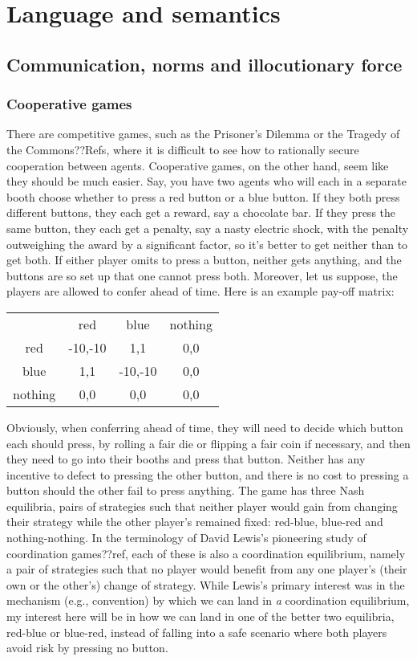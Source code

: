 \def\mychapter{VII}

\chapter{Language and semantics}\label{ch:semantics}
\section{Communication, norms and illocutionary force}
\subsection{Cooperative games}
There are competitive games, such as the Prisoner's Dilemma or the Tragedy of the Commons??Refs, where it is difficult 
to see how to rationally secure cooperation between agents. Cooperative games, on the other hand, seem like
they should be much easier. Say, you have
two agents who will each in a separate booth choose whether to press a red button or a blue button. If they both
press different buttons, they each get a reward, say a chocolate bar. If they press the same button, they 
each get a penalty, say a nasty electric shock, with the penalty outweighing the award by a significant factor, so it's better 
to get neither than to get both. If either player omits to press a button, neither gets anything, and the buttons are so 
set up that one cannot press both. Moreover, let us suppose, the players are allowed to confer ahead of time. Here is an
example pay-off matrix:

\begin{center}
\begin{tabular}{ cccc }
\hline
    & red & blue & nothing \\
red & -10,-10 & 1,1  & 0,0 \\
blue & 1,1 & -10,-10 & 0,0 \\
nothing & 0,0 & 0,0 & 0,0 \\
\hline
\end{tabular}
\end{center}

Obviously, when conferring ahead of time, they will need to decide which button each should press, by rolling a fair die or
flipping a fair coin if
necessary, and then they need to go into their booths and press that button. Neither has any incentive to defect
to pressing the other button, and there is no cost to pressing a button should the other fail to press
anything. The game has three Nash equilibria, pairs of strategies such that neither player would gain from
changing their strategy while the other player's remained fixed: red-blue, blue-red and nothing-nothing. In 
the terminology of David Lewis's pioneering study of coordination games??ref, each of these is also a coordination 
equilibrium, namely a pair of strategies such that no player would benefit from any one player's (their own or the other's) change of strategy. While Lewis's primary interest was in the mechanism (e.g., convention) by which we can land
in \textit{a} coordination equilibrium, my interest here will be in how we can land in one of the better two equilibria,
red-blue or blue-red, instead of falling into a safe scenario where both players avoid risk by pressing no button. 

